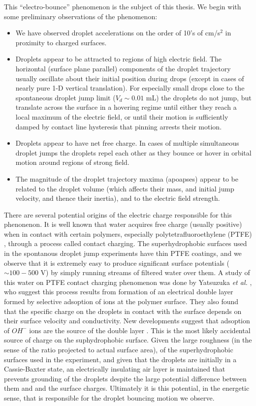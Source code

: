 \documentclass[10pt,a4paper]{article}
\begin{document}
This ``electro-bounce'' phenomenon is the subject of this thesis. We begin with some preliminary observations of the phenomenon:
\begin{itemize}
\item We have observed droplet accelerations on the order of 10's of cm/s$^2$ in proximity to charged surfaces.
\item Droplets appear to be attracted to regions of high electric field. The horizontal (surface plane parallel) components of the droplet trajectory usually oscillate about their initial position during drops (except in cases of nearly pure 1-D vertical translation). For especially small drops close to the spontaneous droplet jump limit ($V_d \sim 0.01$ mL) the droplets do not jump, but translate across the surface in a hovering regime until either they reach a local maximum of the electric field, or until their motion is sufficiently damped by contact line hysteresis that pinning arrests their motion.
\item Droplets appear to have net free charge. In cases of multiple simultaneous droplet jumps the droplets repel each other as they bounce or hover in orbital motion around regions of strong field.
\item The magnitude of the droplet trajectory maxima (apoapses) appear to be related to the droplet volume (which affects their mass, and initial jump velocity, and thence their inertia), and to the electric field strength.
\end{itemize}

There are several potential origins of the electric charge responsible for this phenonenon. It is well known that water acquires free charge (usually positive) when in contact with certain polymers, especially polytetrafluoroethylene (PTFE) \cite{langmuir_surface_1938}, through a process called contact charging. The superhydrophobic surfaces used in the spontanous droplet jump experiments have thin PTFE coatings, and we observe that it is extremely easy to produce significant surface potentials ($\sim 100-500$ V) by simply running streams of filtered water over them. A study of this water on PTFE contact charging phenomenon was done by Yatsuzuka \emph{et al.} \cite{yatsuzuka_electrification_1994}, who suggest this process results from formation of an electrical double layer formed by selective adsoption of ions at the polymer surface. They also found that the specific charge on the droplets in contact with the surface depends on their surface velocity and conductivity. New developments suggest that adsoption of $OH^-$ ions are the source of the double layer \cite{beattie_intrinsic_2006} \cite{strazdaite_water_2015}. This is the most likely accidental source of charge on the suphydrophobic surface. Given the large roughness (in the sense of the ratio projected to actual surface area), of the superhydrophobic surfaces used in the experiment, and given that the droplets are initially in a Cassie-Baxter state, an electrically insulating air layer is maintained that prevents grounding of the droplets despite the large potential difference between them and and the surface charges. Ultimately it is this potential, in the energetic sense, that is responsible for the droplet bouncing motion we observe. 
\end{document}
